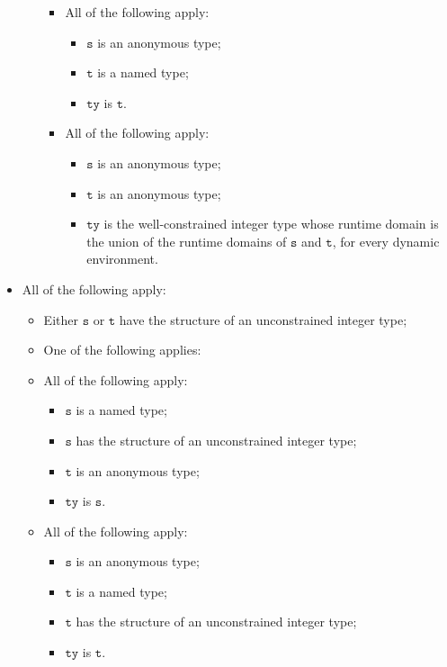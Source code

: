 \documentclass{book}
\newcommand\vt[0]{\texttt{t}}
\newcommand\vs[0]{\texttt{s}}
\newcommand\tty[0]{\texttt{ty}}
\begin{document}
\begin{itemize}
\begin{itemize}
\begin{itemize}
      \item All of the following apply:
        \begin{itemize}
        \item $\vs$ is an anonymous type;
        \item $\vt$ is a named type;
        \item $\tty$ is $\vt$.
        \end{itemize}

      \item All of the following apply:
        \begin{itemize}
        \item $\vs$ is an anonymous type;
        \item $\vt$ is an anonymous type;
	\item $\tty$ is the well-constrained integer type whose runtime domain is the union of the
	  runtime domains of $\vs$ and $\vt$, for every dynamic environment.
        \end{itemize}
      \end{itemize}
    \end{itemize}

  \item All of the following apply:
    \begin{itemize}
    \item Either $\vs$ or $\vt$ have the structure of an unconstrained integer type;
    \item One of the following applies:

      \item All of the following apply:
        \begin{itemize}
        \item $\vs$ is a named type;
        \item $\vs$ has the structure of an unconstrained integer type;
        \item $\vt$ is an anonymous type;
        \item $\tty$ is $\vs$.
        \end{itemize}

      \item All of the following apply:
        \begin{itemize}
        \item $\vs$ is an anonymous type;
        \item $\vt$ is a named type;
        \item $\vt$ has the structure of an unconstrained integer type;
        \item $\tty$ is $\vt$.
        \end{itemize}


\end{itemize}
\end{itemize}
\end{document}
